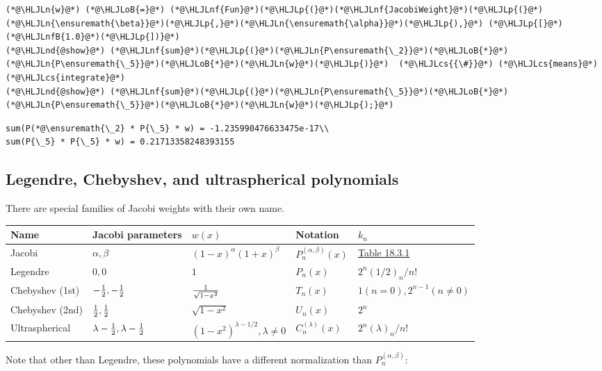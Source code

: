 \documentclass[12pt,landscape]{article}
\newcommand{\HLJLn}[1]{#1}
\newcommand{\HLJLnd}[1]{\textcolor[RGB]{214,102,97}{#1}}
\newcommand{\HLJLnf}[1]{\textcolor[RGB]{66,102,213}{#1}}
\newcommand{\HLJLnfB}[1]{\textcolor[RGB]{59,151,46}{#1}}
\newcommand{\HLJLoB}[1]{\textcolor[RGB]{102,102,102}{\textbf{#1}}}
\newcommand{\HLJLp}[1]{#1}
\newcommand{\HLJLcs}[1]{\textcolor[RGB]{153,153,119}{\textit{#1}}}
\begin{document}
{\begin{lstlisting}
(*@\HLJLn{w}@*) (*@\HLJLoB{=}@*) (*@\HLJLnf{Fun}@*)(*@\HLJLp{(}@*)(*@\HLJLnf{JacobiWeight}@*)(*@\HLJLp{(}@*)(*@\HLJLn{\ensuremath{\beta}}@*)(*@\HLJLp{,}@*)(*@\HLJLn{\ensuremath{\alpha}}@*)(*@\HLJLp{),}@*) (*@\HLJLp{[}@*)(*@\HLJLnfB{1.0}@*)(*@\HLJLp{])}@*)
(*@\HLJLnd{@show}@*) (*@\HLJLnf{sum}@*)(*@\HLJLp{(}@*)(*@\HLJLn{P\ensuremath{\_2}}@*)(*@\HLJLoB{*}@*)(*@\HLJLn{P\ensuremath{\_5}}@*)(*@\HLJLoB{*}@*)(*@\HLJLn{w}@*)(*@\HLJLp{)}@*)  (*@\HLJLcs{{\#}}@*) (*@\HLJLcs{means}@*) (*@\HLJLcs{integrate}@*)
(*@\HLJLnd{@show}@*) (*@\HLJLnf{sum}@*)(*@\HLJLp{(}@*)(*@\HLJLn{P\ensuremath{\_5}}@*)(*@\HLJLoB{*}@*)(*@\HLJLn{P\ensuremath{\_5}}@*)(*@\HLJLoB{*}@*)(*@\HLJLn{w}@*)(*@\HLJLp{);}@*)
\end{lstlisting}

\begin{lstlisting}
sum(P(*@\ensuremath{\_2} * P{\_5} * w) = -1.235990476633475e-17\\
sum(P{\_5} * P{\_5} * w) = 0.21713358248393155
\end{lstlisting}


\subsection{Legendre, Chebyshev, and ultraspherical polynomials}
There are special families of Jacobi weights with their own name.

\begin{tabular}
{l | l | l | l | l}
Name & Jacobi parameters & $w(x)$ & Notation & $k_n$ \\
\hline
Jacobi & $\alpha,\beta$ & $(1-x)^{\alpha} (1+x)^\beta$ & $P_n^{(\alpha,\beta)}(x)$ & \href{http://dlmf.nist.gov/18.3}{Table 18.3.1} \\
Legendre & $0,0$ & $1$ & $P_n(x)$ & $2^n(1/2)_n/n!$ \\
Chebyshev (1st) & $-{1 \over 2},-{1 \over 2}$ & $1 \over \sqrt{1-x^2}$ & $T_n(x)$ & $1 (n=0), 2^{n-1} (n \neq 0)$ \\
Chebyshev (2nd) & ${1 \over 2},{1 \over 2}$ & $\sqrt{1-x^2}$ & $U_n(x)$ & $2^n$ \\
Ultraspherical & $\lambda-{1 \over 2},\lambda-{1 \over 2}$ & $(1-x^2)^{\lambda - 1/2}, \lambda \neq 0$ & $C_n^{(\lambda)}(x)$ & $2^n(\lambda)_n/n!$ \\
\end{tabular}
Note that other than Legendre, these polynomials have a different normalization than $P_n^{(\alpha,\beta)}$:


}
\end{document}
